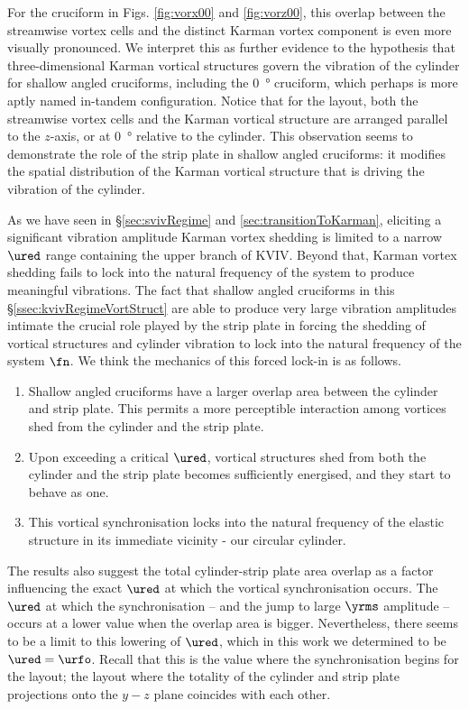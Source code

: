 \documentclass[a4paper,fleqn]{cas-sc}
\begin{document}
For the \angon{} cruciform in Figs. \ref{fig:vorx00} and \ref{fig:vorz00}, this overlap between the streamwise vortex cells and the distinct Karman vortex component is even more visually pronounced. We interpret this as further evidence to the hypothesis that three-dimensional Karman vortical structures govern the vibration of the cylinder for shallow angled cruciforms, including the \SI{0}{\degree} cruciform, which perhaps is more aptly named in-tandem configuration. Notice that for the \angon{} layout, both the streamwise vortex cells and the Karman vortical structure are arranged parallel to the $z$-axis, or at \SI{0}{\degree} relative to the cylinder. This observation seems to demonstrate the role of the strip plate in shallow angled cruciforms: it modifies the spatial distribution of the Karman vortical structure that is driving the vibration of the cylinder.

As we have seen in \S\ref{sec:svivRegime} and \ref{sec:transitionToKarman}, eliciting a significant vibration amplitude Karman vortex shedding is limited to a narrow $\ured$ range containing the upper branch of KVIV. Beyond that, Karman vortex shedding fails to lock into the natural frequency of the system to produce meaningful vibrations. The fact that shallow angled cruciforms in this \S\ref{ssec:kvivRegimeVortStruct} are able to produce very large vibration amplitudes intimate the crucial role played by the strip plate in forcing the shedding of vortical structures and cylinder vibration to lock into the natural frequency of the system $\fn$. We think the mechanics of this forced lock-in is as follows.

\begin{enumerate}
  \item Shallow angled cruciforms have a larger overlap area between the cylinder and strip plate. This permits a more perceptible interaction among vortices shed from the cylinder and the strip plate.
  \item Upon exceeding a critical $\ured$, vortical structures shed from both the cylinder and the strip plate becomes sufficiently energised, and they start to behave as one.
  \item This vortical synchronisation locks into the natural frequency of the elastic structure in its immediate vicinity - our circular cylinder.
\end{enumerate}

\noindent The results also suggest the total cylinder-strip plate area overlap as a factor influencing the exact $\ured$ at which the vortical synchronisation occurs. The $\ured$ at which the synchronisation -- and the jump to large $\yrms$ amplitude -- occurs at a lower value when the overlap area is bigger. Nevertheless, there seems to be a limit to this lowering of $\ured$, which in this work we determined to be $\ured = \urfo$. Recall that this is the value where the synchronisation begins for the \angon{} layout; the layout where the totality of the cylinder and strip plate projections onto the $y-z$ plane coincides with each other.
\end{document}
